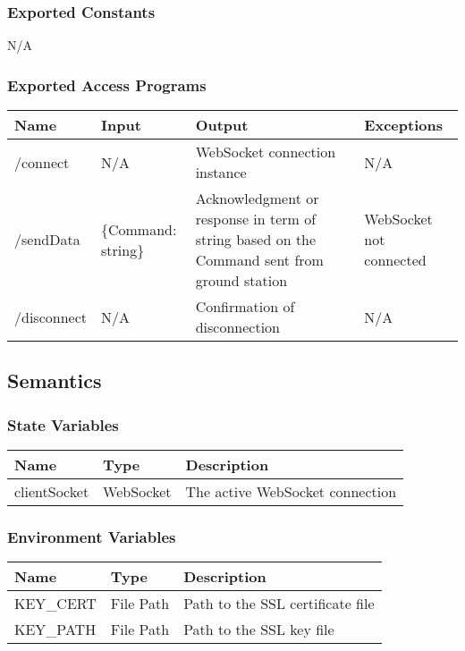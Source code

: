 \documentclass[12pt, titlepage]{article}
\begin{document}
\subsubsection{Exported Constants}
N/A

\subsubsection{Exported Access Programs}

\begin{center}
\begin{tabular}{p{6cm} p{2cm} p{4cm} p{2cm}}
\hline
\textbf{Name} & \textbf{Input} & \textbf{Output} & \textbf{Exceptions}\\
\hline
/connect& N/A& WebSocket connection instance& N/A\\
\hline
/sendData& \{Command: string\}& Acknowledgment or response in term of string based on the Command sent from ground station& WebSocket not connected\\
\hline
/disconnect& N/A& Confirmation of disconnection& N/A\\
\hline
\end{tabular}
\end{center}

\subsection{Semantics}

\subsubsection{State Variables}

\begin{center}
\begin{tabular}{|p{4cm} |p{4cm} |p{4cm}|}
\hline
\textbf{Name} & \textbf{Type} & \textbf{Description} \\
\hline
clientSocket & WebSocket & The active WebSocket connection \\
\hline
\end{tabular}
\end{center}

\subsubsection{Environment Variables}

\begin{center}
\begin{tabular}{|p{4cm} |p{4cm} |p{4cm}|}
\hline
\textbf{Name} & \textbf{Type} & \textbf{Description} \\
\hline
KEY\_CERT & File Path & Path to the SSL certificate file \\
\hline
KEY\_PATH & File Path & Path to the SSL key file \\
\hline
\end{tabular}
\end{center}
\end{document}
